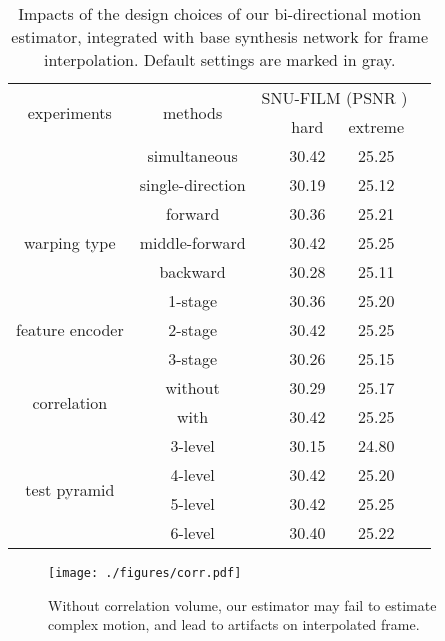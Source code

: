 \documentclass[10pt,twocolumn,letterpaper]{article}
\begin{document}
\begin{table}[tb]
\centering
\setlength{\tabcolsep}{0pt}
\begin{tabular*}{0.48\textwidth}{@{\extracolsep{\fill}}*{5}{c}}
\hline
\multirow{2}{*}{experiments} & \multirow{2}{*}{methods} & \multicolumn{2}{c}{SNU-FILM (PSNR )}\\
\cline{3-4}
                             &   & ~~~hard & extreme \\
\Xhline{2\arrayrulewidth}
\multirow{2}{*}{bi-directional}& \cellcolor{gray!40} simultaneous & ~~~30.42 & 25.25 \\
                              & single-direction & ~~~30.19 & 25.12 \\
\hline
\multirow{3}{*}{warping type} & forward & ~~~30.36 & 25.21 \\
                              & \cellcolor{gray!40}middle-forward & ~~~30.42 & 25.25 \\
                              & backward & ~~~30.28 & 25.11 \\
\hline
\multirow{3}{*}{feature encoder} & 1-stage & ~~~30.36 & 25.20 \\
                             & \cellcolor{gray!40}2-stage & ~~~30.42 & 25.25 \\
                                    & 3-stage & ~~~30.26 & 25.15 \\
\hline
\multirow{2}{*}{correlation}  
                              & without & ~~~30.29 & 25.17 \\
                              & \cellcolor{gray!40}with & ~~~30.42 & 25.25 \\
\hline
\multirow{4}{*}{test pyramid}     & 3-level  & ~~~30.15 & 24.80  \\
                                  & 4-level  & ~~~30.42 & 25.20 \\
                                  & \cellcolor{gray!40} 5-level & ~~~30.42 & 25.25 \\
                                  & 6-level & ~~~30.40 & 25.22 \\
\hline
\end{tabular*}
\caption{Impacts of the design choices of our bi-directional motion estimator,
integrated with base synthesis network for frame interpolation. Default settings
are marked in \colorbox{gray!40}{gray}.}
\label{tab:ablation_flow}
\end{table}




\begin{figure}[tb]
\centering
\texttt{[image: ./figures/corr.pdf]}
\caption{Without correlation volume, our estimator may fail to estimate complex
motion, and lead to artifacts on interpolated frame.}
\label{fig:corr}
\end{figure}
\end{document}
